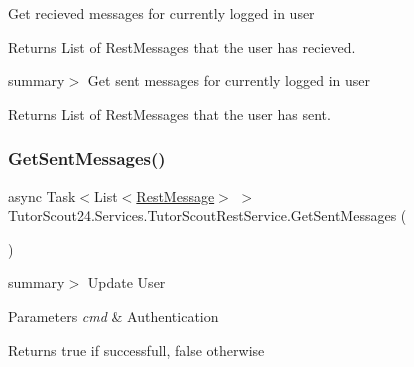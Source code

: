 Get recieved messages for currently logged in user 

\begin{DoxyReturn}{Returns}
List of Rest\+Messages that the user has recieved.
\end{DoxyReturn}
summary$>$ Get sent messages for currently logged in user 

\begin{DoxyReturn}{Returns}
List of Rest\+Messages that the user has sent.
\end{DoxyReturn}
\mbox{\label{class_tutor_scout24_1_1_services_1_1_tutor_scout_rest_service_a1efcdc1fe62961a72d354f4fe5170d18}} 
\subsubsection{\texorpdfstring{Get\+Sent\+Messages()}{GetSentMessages()}}
{\footnotesize\ttfamily async Task$<$List$<$\mbox{\hyperlink{class_tutor_scout24_1_1_models_1_1_chat_1_1_rest_message}{Rest\+Message}}$>$ $>$ Tutor\+Scout24.\+Services.\+Tutor\+Scout\+Rest\+Service.\+Get\+Sent\+Messages (\begin{DoxyParamCaption}{ }\end{DoxyParamCaption})\hspace{0.3cm}{\ttfamily [inline]}}

summary$>$ Update User 


\begin{DoxyParams}{Parameters}
{\em cmd} & Authentication\\
\hline
\end{DoxyParams}
\begin{DoxyReturn}{Returns}
true if successfull, false otherwise
\end{DoxyReturn}
\mbox{\label{class_tutor_scout24_1_1_services_1_1_tutor_scout_rest_service_a6324b2d5d4b9a9fe5dd7592417e8917c}} 
